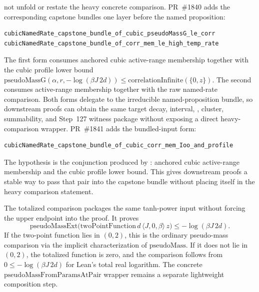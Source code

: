 \documentclass[a4paper,11pt]{article}
\begin{document}
not unfold or restate the heavy concrete comparison.
PR~\#1840 adds the corresponding capstone bundles one layer before the named
proposition:
\begin{Verbatim}[breaklines=true,breakanywhere=true]
cubicNamedRate_capstone_bundle_of_cubic_pseudoMassG_le_corr
cubicNamedRate_capstone_bundle_of_corr_mem_le_high_temp_rate
\end{Verbatim}
The first form consumes anchored cubic active-range membership together with the
cubic profile lower bound
\(\mathrm{pseudoMassG}(\alpha,r,-\log(\beta J\,2d))\le
\mathrm{correlationInfinite}(\{0,z\})\).  The second consumes active-range
membership together with the raw named-rate comparison.  Both forms delegate to
the irreducible named-proposition bundle, so downstream proofs can obtain the
same target decay, interval, , cluster, summability, and
Step~127 witness package without exposing a direct 
heavy-comparison wrapper.
PR~\#1841 adds the bundled-input form:
\begin{Verbatim}[breaklines=true,breakanywhere=true]
cubicNamedRate_capstone_bundle_of_cubic_corr_mem_Ioo_and_profile
\end{Verbatim}
The hypothesis is the conjunction produced by
: anchored cubic
active-range membership and the cubic profile lower bound.  This gives
downstream proofs a stable way to pass that pair into the capstone bundle
without placing  itself in the heavy comparison
statement.

The totalized comparison
packages the same tanh-power input without forcing the upper endpoint into the
proof.  It proves
\[
  \mathrm{pseudoMassExt}\bigl(
    \mathrm{twoPointFunction}\,d\,\langle J,0,\beta\rangle\,z\bigr)
    \le -\log(\beta J\,2d).
\]
If the two-point function lies in $(0,2)$, this is the ordinary pseudo-mass
comparison via the implicit characterization of $\mathrm{pseudoMass}$.  If it
does not lie in $(0,2)$, the totalized function is zero, and the comparison
follows from $0\le -\log(\beta J\,2d)$ for Lean's total real logarithm.  The
concrete $\mathrm{pseudoMassFromParamsAtPair}$ wrapper remains a separate
lightweight composition step.
\end{document}
